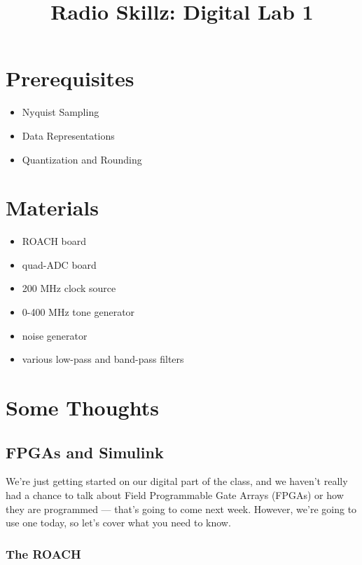 \documentclass[11pt]{article}
\begin{document}
\title{Radio Skillz: Digital Lab 1}

\maketitle

\section*{Prerequisites}

\begin{itemize}
\item Nyquist Sampling
\item Data Representations
\item Quantization and Rounding
\end{itemize}

\section*{Materials}

\begin{itemize}
\item ROACH board
\item quad-ADC board
\item 200 MHz clock source
\item 0-400 MHz tone generator
\item noise generator
\item various low-pass and band-pass filters
\end{itemize}

\section*{Some Thoughts}

\subsection*{FPGAs and Simulink}

We're just getting started on our digital part of the class, and we haven't really had a chance to talk
about Field Programmable Gate Arrays (FPGAs) or how they are programmed --- that's going to come next
week.  However, we're going to use one today, so let's cover what you need to know.

\subsubsection*{The ROACH}
\end{document}

